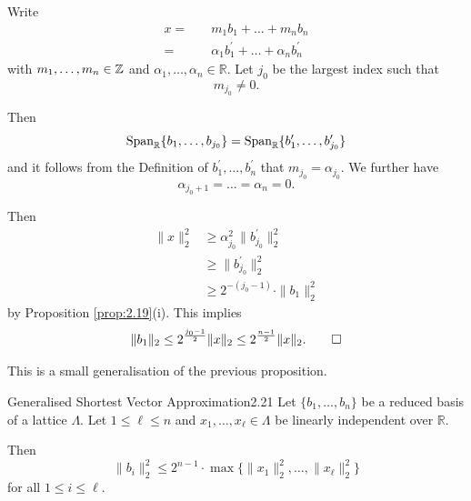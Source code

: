 \documentclass{Vorlesungstemplate_English} %
\begin{document}
\begin{pf}
Write
\begin{align*} x = \quad & m_{1}b_{1} + \dots + m_{n}b_{n} \\
 = \quad & \alpha_{1}b_{1}^{\prime} + \dots + \alpha_{n}b_{n}^{\prime} \end{align*}
 with $m_1, \dots, m_n \in \mathbb{Z}$ and $\alpha_{1}, \dots, \alpha_{n} \in \mathbb{R}$.
Let $j_{0}$ be the largest index such that
\[ m_{j_{0}} \neq 0. \]

Then
\[ \text{Span}_{\mathbb{R}}\{b_{1}, \dots, b_{j_{0}}\} = \text{Span}_{\mathbb{R}}\{b_{1}^{\prime}, \dots, b_{j_{0}}^{\prime}\} \]
and it follows from the Definition of $b_{1}^{\prime}, \dots, b_{n}^{\prime}$ that $m_{j_{0}} = \alpha_{j_{0}}$. We further have
\[ \alpha_{j_{0}+1} = \dots = \alpha_{n} = 0. \]

Then
\begin{align*}
\|x\|_{2}^{2} &\ge \alpha_{j_{0}}^{2} \|b_{j_{0}}^{\prime}\|_{2}^{2} \\
&\ge \|b_{j_{0}}^{\prime}\|_{2}^{2} \\
&\ge 2^{-(j_{0}-1)} \cdot \|b_{1}\|_{2}^{2}
\end{align*}
by Proposition \ref{prop:2.19}(i).
This implies
\[ \|b_{1}\|_{2} \le 2^{\frac{j_{0}-1}{2}} \|x\|_{2} \le 2^{\frac{n-1}{2}} \|x\|_{2}. \qedhere \]
\end{pf}


\noindent This is a small generalisation of the previous proposition.

\begin{proposition}{Generalised Shortest Vector Approximation}{2.21}
Let $\{b_{1}, \dots, b_{n}\}$ be a reduced basis of a lattice $\Lambda$. Let $1 \le \ell \le n$ and $x_{1}, \dots, x_{\ell} \in \Lambda$ be linearly independent over $\mathbb{R}$.

Then
\[ \|b_{i}\|_{2}^{2} \le 2^{n-1} \cdot \max \{ \|x_{1}\|_{2}^{2}, \dots, \|x_{\ell}\|_{2}^{2} \} \]
for all $1 \le i \le \ell$.
\end{proposition}
\end{document}
